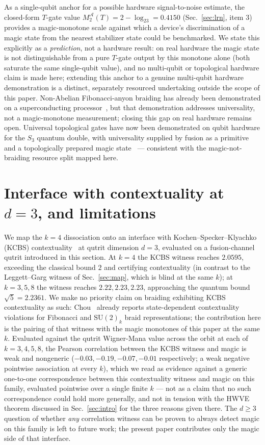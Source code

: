 \documentclass[aps,pra,twocolumn,superscriptaddress,longbibliography,floatfix,nofootinbib]{revtex4-2}
\begin{document}
As a single-qubit anchor for a possible hardware signal-to-noise
estimate, the closed-form $T$-gate value
$M_2^{\mathcal A}(T)=2-\log_23=0.4150$ (Sec.~\ref{sec:lrn}, item 3)
provides a magic-monotone scale against which a device's discrimination
of a magic state from the nearest stabilizer state could be
benchmarked. We state this explicitly as a \emph{prediction}, not a
hardware result: on real hardware the magic state is not
distinguishable from a pure $T$-gate output by this monotone alone
(both saturate the same single-qubit value), and no multi-qubit or
topological hardware claim is made here; extending this anchor to a
genuine multi-qubit hardware demonstration is a distinct, separately
resourced undertaking outside the scope of this paper. Non-Abelian
Fibonacci-anyon braiding has already been demonstrated on a
superconducting processor~\cite{Xu2024magic}, but that demonstration
addresses universality, not a magic-monotone measurement; closing
this gap on real hardware remains open. Universal topological gates
have now been demonstrated on qubit hardware for the $S_3$
quantum double, with universality supplied by fusion as a primitive
and a topologically prepared magic state~\cite{Lo2026} --- consistent
with the magic-not-braiding resource split mapped here.

\section{Interface with contextuality at $d=3$, and limitations}
\label{sec:t5}

We map the $k=4$ dissociation onto an interface with
Kochen--Specker--Klyachko (KCBS) contextuality~\cite{KCBS2008,%
Chou2026} at qutrit dimension $d=3$, evaluated on a fusion-channel
qutrit introduced in this section. At $k=4$ the KCBS
witness reaches $2.0595$, exceeding the classical bound $2$ and
certifying contextuality (in contrast to the Leggett--Garg witness of
Sec.~\ref{sec:map}, which is blind at the same $k$); at $k=3,5,8$ the
witness reaches $2.22,2.23,2.23$, approaching the quantum bound
$\sqrt5=2.2361$. We make no priority claim on braiding exhibiting KCBS
contextuality as such: Chou~\cite{Chou2026} already reports
state-dependent contextuality violations for Fibonacci and
$\mathrm{SU}(2)_k$ braid representations; the contribution here is
the pairing of that witness with the magic monotones of this paper at
the same $k$. Evaluated against the qutrit Wigner-Mana value across
the orbit at each of $k=3,4,5,8$, the Pearson correlation
between the KCBS witness and magic is weak and nongeneric
($-0.03,-0.19,-0.07,-0.01$ respectively; a weak negative pointwise
association at every $k$), which we read as evidence against a
generic one-to-one correspondence between this contextuality witness
and magic on this family, evaluated pointwise over a single finite
$k$ --- not as a claim that no such correspondence could hold more
generally, and not in tension with the HWVE theorem discussed in
Sec.~\ref{sec:intro} for the three reasons given there. The
$d\ge3$ question of whether \emph{any} correlation witness can be
proven to always detect magic on this family is left to future work;
the present paper contributes only the magic side of that interface.
\end{document}
